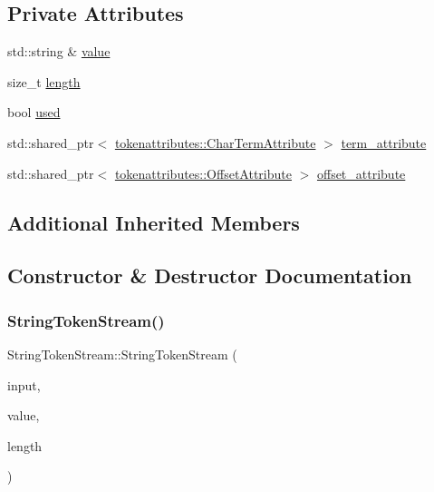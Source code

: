 \subsection*{Private Attributes}
\begin{DoxyCompactItemize}
\item 
std\+::string \& \mbox{\hyperlink{classlucene_1_1core_1_1analysis_1_1StringTokenStream_a6fb3e249a092b3cd9b008449d256b6a8}{value}}
\item 
size\+\_\+t \mbox{\hyperlink{classlucene_1_1core_1_1analysis_1_1StringTokenStream_ad16af1e525efb086aac50b843f80b418}{length}}
\item 
bool \mbox{\hyperlink{classlucene_1_1core_1_1analysis_1_1StringTokenStream_a26d177c979b40cc9ea6928567906cc87}{used}}
\item 
std\+::shared\+\_\+ptr$<$ \mbox{\hyperlink{classlucene_1_1core_1_1analysis_1_1tokenattributes_1_1CharTermAttribute}{tokenattributes\+::\+Char\+Term\+Attribute}} $>$ \mbox{\hyperlink{classlucene_1_1core_1_1analysis_1_1StringTokenStream_a4fcb486b031bc4d32047e09643da3099}{term\+\_\+attribute}}
\item 
std\+::shared\+\_\+ptr$<$ \mbox{\hyperlink{classlucene_1_1core_1_1analysis_1_1tokenattributes_1_1OffsetAttribute}{tokenattributes\+::\+Offset\+Attribute}} $>$ \mbox{\hyperlink{classlucene_1_1core_1_1analysis_1_1StringTokenStream_a52378286cf3479adf7932ff4555e2b0f}{offset\+\_\+attribute}}
\end{DoxyCompactItemize}
\subsection*{Additional Inherited Members}


\subsection{Constructor \& Destructor Documentation}
\mbox{\label{classlucene_1_1core_1_1analysis_1_1StringTokenStream_a413ff02bcf7a9f2d617f9e25021f9a44}} 
\subsubsection{\texorpdfstring{String\+Token\+Stream()}{StringTokenStream()}}
{\footnotesize\ttfamily String\+Token\+Stream\+::\+String\+Token\+Stream (\begin{DoxyParamCaption}\item[{\mbox{\hyperlink{classlucene_1_1core_1_1util_1_1AttributeFactory}{lucene\+::core\+::util\+::\+Attribute\+Factory}} \&}]{input,  }\item[{std\+::string \&}]{value,  }\item[{size\+\_\+t}]{length }\end{DoxyParamCaption})}

